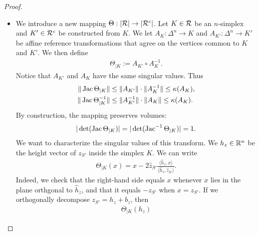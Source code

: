 \documentclass[10pt,letterpaper]{article}
\begin{document}
\begin{proof}
\begin{itemize}
                
        \item 
        We introduce a new mapping $\Theta : |{\mathcal R}| \rightarrow |{\mathcal R}^c|$.
        Let $K \in {\mathcal R}$ be an $n$-simplex and $K' \in {\mathcal R}^{c}$ be constructed from $K$.
        We let $A_{K} : \Delta^{n} \rightarrow K$ and $A_{K'} : \Delta^{n} \rightarrow K'$
        be affine reference transformations
        that agree on the vertices common to $K$ and $K'$.
        We then define 
        \begin{align*}
            \Theta_{|K} := A_{K'} \circ A_{K}^{-1}.
        \end{align*}
        Notice that $A_{K'}$ and $A_{K}$ have the same singular values. Thus
        \begin{align*}
            \| \operatorname{{\rm Jac}} \Theta_{|K}      \| &\leq \| A_{K'} \| \cdot \| A_{K}^{-1} \| \leq \kappa(A_{K}),
            \\
            \| \operatorname{{\rm Jac}} \Theta_{|K}^{-1} \| &\leq \| A_{K'}^{-1} \| \cdot \| A_{K} \| \leq \kappa(A_{K}).
        \end{align*}
        By construction, the mapping preserves volumes:
        \begin{align*}
            |\det( \operatorname{{\rm Jac}}      \Theta_{|K} )|
            = 
            |\det( \operatorname{{\rm Jac}}^{-1} \Theta_{|K} )|
            =
            1
            .
        \end{align*}
        We want to characterize the singular values of this transform. 
        We $h_z \in {\mathbb R}^{n}$ be the height vector of $z_{S'}$ inside the simplex $K$.
        We can write
        \begin{align*}
            \Theta_{|K}(x) 
            = 
            x
            - 
            2 \hat z_{S'} \frac{\langle \hat h_z, x \rangle}{\langle \hat h_z, \hat z_{S'} \rangle}
            .
        \end{align*}
        Indeed, we check that the right-hand side equals $x$ whenever $x$ lies in the plane orthgonal to $\hat h_z$,
        and that it equals $-z_{S'}$ when $x = z_{S'}$.
        If we orthogonally decompose $z_{S'} = h_z + b_z$, then 
        \begin{align*}
            \Theta_{|K}( h_z ) 

\end{align*}
\end{itemize}
\end{proof}
\end{document}
